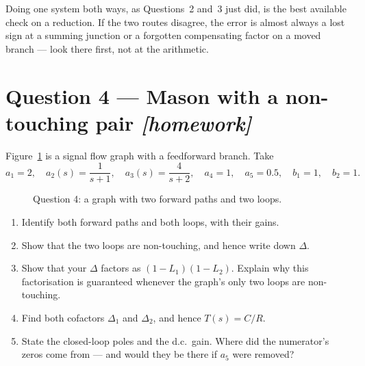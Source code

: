 \documentclass[11pt,a4paper]{article}
\newcommand{\athome}{\hfill{\small\color{fflag}\itshape[homework]}}
\begin{document}
\begin{keyidea}
Doing one system both ways, as Questions~2 and~3 just did, is the best
available check on a reduction. If the two routes disagree, the error is
almost always a lost sign at a summing junction or a forgotten compensating
factor on a moved branch --- look there first, not at the arithmetic.
\end{keyidea}

\section*{Question 4 --- Mason with a non-touching pair \athome}

Figure~\ref{fig:q4} is a signal flow graph with a feedforward branch. Take
\[
  a_1=2,\quad a_2(s)=\frac{1}{s+1},\quad a_3(s)=\frac{4}{s+2},\quad a_4=1,
  \quad a_5=0.5,\quad b_1=1,\quad b_2=1 .
\]

\begin{figure}[htbp]
\centering
{}
\caption{Question 4: a graph with two forward paths and two loops.}
\label{fig:q4}
\end{figure}

\begin{enumerate}[label=(\alph*)]
\item Identify both forward paths and both loops, with their gains.
\item Show that the two loops are non-touching, and hence write down $\Delta$.
\item Show that your $\Delta$ factors as $(1-L_1)(1-L_2)$. Explain why this
      factorisation is guaranteed whenever the graph's only two loops are
      non-touching.
\item Find both cofactors $\Delta_1$ and $\Delta_2$, and hence $T(s)=C/R$.
\item State the closed-loop poles and the d.c.\ gain. Where did the numerator's
      zeros come from --- and would they be there if $a_5$ were removed?
\end{enumerate}
\end{document}
